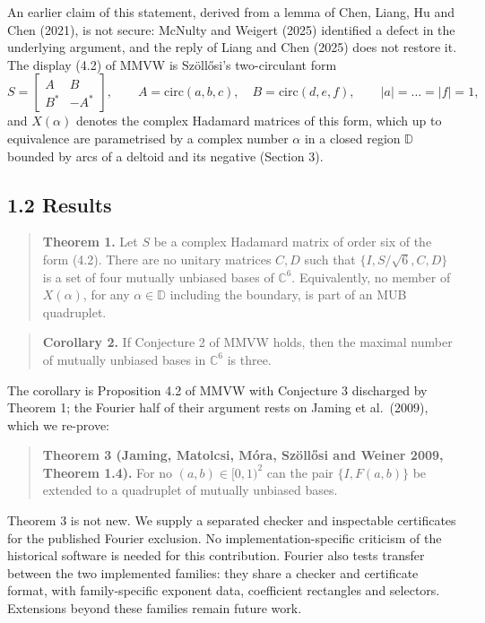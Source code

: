 \documentclass[
  11pt,
]{article}
\begin{document}
An earlier claim of this statement, derived from a lemma of Chen, Liang,
Hu and Chen (2021), is not secure: McNulty and Weigert (2025) identified
a defect in the underlying argument, and the reply of Liang and Chen
(2025) does not restore it. The display (4.2) of MMVW is Szöllősi's
two-circulant form \[
S=\begin{bmatrix} A&B\\ B^*&-A^*\end{bmatrix},\qquad A=\mathrm{circ}(a,b,c),\quad B=\mathrm{circ}(d,e,f),\qquad |a|=\dots=|f|=1 ,
\] and \(X(\alpha)\) denotes the complex Hadamard matrices of this form,
which up to equivalence are parametrised by a complex number \(\alpha\)
in a closed region \(\mathbb D\) bounded by arcs of a deltoid and its
negative (Section 3).

\subsection{1.2 Results}\label{results}

\begin{quote}
\textbf{Theorem 1.} Let \(S\) be a complex Hadamard matrix of order six
of the form (4.2). There are no unitary matrices \(C,D\) such that
\(\{I,S/\sqrt6,C,D\}\) is a set of four mutually unbiased bases of
\(\mathbb C^6\). Equivalently, no member of \(X(\alpha)\), for any
\(\alpha\in\mathbb D\) including the boundary, is part of an MUB
quadruplet.
\end{quote}

\begin{quote}
\textbf{Corollary 2.} If Conjecture 2 of MMVW holds, then the maximal
number of mutually unbiased bases in \(\mathbb C^6\) is three.
\end{quote}

The corollary is Proposition 4.2 of MMVW with Conjecture 3 discharged by
Theorem 1; the Fourier half of their argument rests on Jaming et
al.~(2009), which we re-prove:

\begin{quote}
\textbf{Theorem 3 (Jaming, Matolcsi, Móra, Szöllősi and Weiner 2009,
Theorem 1.4).} For no \((a,b)\in[0,1)^2\) can the pair \(\{I,F(a,b)\}\)
be extended to a quadruplet of mutually unbiased bases.
\end{quote}

Theorem 3 is not new. We supply a separated checker and inspectable
certificates for the published Fourier exclusion. No
implementation-specific criticism of the historical software is needed
for this contribution. Fourier also tests transfer between the two
implemented families: they share a checker and certificate format, with
family-specific exponent data, coefficient rectangles and selectors.
Extensions beyond these families remain future work.
\end{document}
